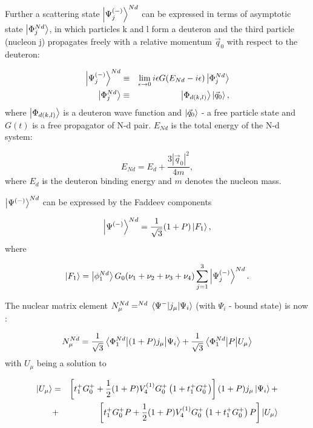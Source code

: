     Further a scattering state $\ket{\Psi^{(-)}_j}^{Nd}$ can be expressed
    in terms of asymptotic state $\ket{\Phi^{Nd}_j}$, in which particles
    k and l form a deuteron and the third particle (nucleon j)
     propagates freely with a relative momentum $\vec{q}_0$ with 
    respect to the deuteron:

    \begin{eqnarray}
        \ket{\Psi^{(-)}_j}^{Nd} &\equiv& \lim_{\epsilon \rightarrow 0} 
        i \epsilon G(E_{Nd} - i\epsilon)\ket{\Phi^{Nd}_j}\\
        \ket{\Phi^{Nd}_j} &\equiv& \ket{\Phi_{d(k,l)}}\ket{\vec{q}_0},
    \end{eqnarray}
    where $\ket{\Phi_{d(k,l)}}$ is a deuteron wave function and 
    $\ket{\vec{q}_0}$ - a free particle state and $G(t)$ is 
    a free propagator of N-d pair. 
    $E_{Nd}$ is the total energy of the N-d system:

    \begin{equation}
        E_{Nd} = E_d + \frac{3 |\vec{q}_0|^2}{4m},
    \end{equation}
    where $E_d$ is the deuteron binding energy and $m$ denotes the nucleon mass. 

    $\ket{\Psi^{(-)}}^{Nd}$ can be expressed by the Faddeev components

    \begin{equation}
        \ket{\Psi^{(-)}}^{Nd} = \frac{1}{\sqrt{3}} (1+P) \ket{F_1},
    \end{equation}
    where 
    
    \begin{equation}
        \ket{F_1} = \ket{\phi_1^{Nd}} G_0 (\nu_1 + \nu_2 + \nu_3 + \nu_4) 
        \sum_{j=1}^3 \ket{\Psi_j^{(-)}}^{Nd}.
    \end{equation}

    The nuclear matrix element $N_\mu^{Nd} = ^{Nd} \matrixel{\Psi^{-}}{j_\mu}{\Psi_i}$ 
    (with $\Psi_i$ - bound state) is now \cite{GLOCKLE_report_1996, skibinski_prc_2003} :

    \begin{equation}
        N_\mu^{N d}=\frac{1}{\sqrt{3}} \matrixel{\Phi_1^{N d}}{(1+P) j_\mu}{\Psi_i}
        +\frac{1}{\sqrt{3}} \matrixel{\Phi_1^{N d}}{P}{U_\mu}
    \end{equation}
    with $U_\mu$ being a solution to

    \begin{eqnarray}
       \ket{U_\mu} &=& \left[t_1^{+} G_0^{+}+\frac{1}{2}(1+P) V_4^{(1)} G_0^{+}\left(1+t_1^{+} G_0^{+}\right)\right](1+P) j_\mu \ket{\Psi_i} + \nonumber\\
       &+& \left[t_1^{+} G_0^{+} P+\frac{1}{2}(1+P) V_4^{(1)} G_0^{+}\left(1+t_1^{+} G_0^{+}\right) P\right]\ket{U_\mu}
       \label{u_mu_nd}
    \end{eqnarray}

